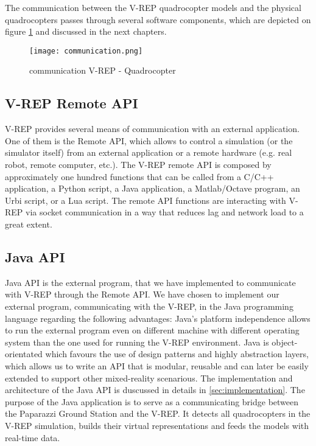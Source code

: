 The communication between the V-REP quadrocopter models and the physical quadrocopters passes through several software components, which are depicted on figure \ref{fig:communication} and discussed in the next chapters.

\begin{figure}[h!]
 \begin{center}
  \texttt{[image: communication.png]}
 \end{center}
  \caption{communication V-REP - Quadrocopter\label{fig:communication}}
\end{figure}

\subsection{V-REP Remote API}
V-REP provides several means of communication with an external application. One of them is the Remote API, which allows to control a simulation (or the simulator itself) from an external application or a remote hardware (e.g. real robot, remote computer, etc.). The V-REP remote API is composed by approximately one hundred functions that can be called from a C/C++ application, a Python script, a Java application, a Matlab/Octave program, an Urbi script, or a Lua script. The remote API functions are interacting with V-REP via socket communication in a way that reduces lag and network load to a great extent.

\subsection{Java API}
Java API is the external program, that we have implemented to communicate with V-REP through the Remote API.
We have chosen to implement our external program, communicating with the V-REP, in the Java programming language regarding the following advantages: Java's platform independence allows to run the external program even on different machine with different operating system than the one used for running the V-REP environment.  Java is object-orientated which favours the use of design patterns and highly abstraction layers, which allows us to write an API that is modular, reusable and can later be easily extended to support other mixed-reality scenarious. The implementation and architecture of the Java API is duscussed in details in \ref{sec:implementation}. The purpose of the Java application is to serve as a communicating bridge between the Paparazzi Ground Station and the V-REP. It detects all quadrocopters in the V-REP simulation, builds their virtual representations and feeds the models with real-time data.

